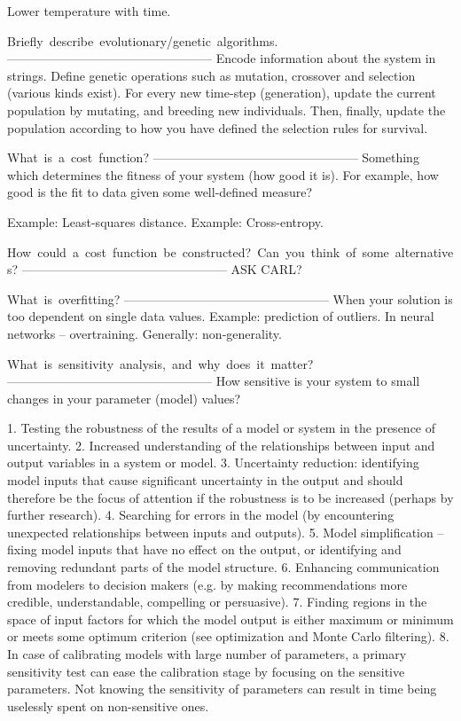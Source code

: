Lower temperature with time. 

Briefly describe evolutionary/genetic algorithms.
--------------------------------------------------
Encode information about the system in strings. Define genetic operations such
as mutation, crossover and selection (various kinds exist). For every new
time-step (generation), update the current population by mutating, and breeding
new individuals. Then, finally, update the population according to how you have
defined the selection rules for survival. 

What is a cost function?
--------------------------------------------------
Something which determines the fitness of your system (how good it is). For
example, how good is the fit to data given some well-defined measure?  

Example: Least-squares distance.
Example: Cross-entropy.

How could a cost function be constructed? Can you think of some alternatives?
--------------------------------------------------
ASK CARL?

What is overfitting?
--------------------------------------------------
When your solution is too dependent on single data values. Example: prediction
of outliers. In neural networks -- overtraining. Generally: non-generality. 
   
What is sensitivity analysis, and why does it matter?
--------------------------------------------------
How sensitive is your system to small changes in your parameter (model) values?  

1. Testing the robustness of the results of a model or system in the presence of uncertainty.
2. Increased understanding of the relationships between input and output variables 
   in a system or model.
3. Uncertainty reduction: identifying model inputs that cause significant uncertainty 
   in the output and should therefore be the focus of attention if the robustness is to be 
   increased (perhaps by further research).
4. Searching for errors in the model (by encountering unexpected relationships between inputs 
   and outputs).
5. Model simplification – fixing model inputs that have no effect on the output, or identifying 
   and removing redundant parts of the model structure.
6. Enhancing communication from modelers to decision makers (e.g. by making recommendations 
   more credible, understandable, compelling or persuasive).
7. Finding regions in the space of input factors for which the model output is either maximum 
   or minimum or meets some optimum criterion (see optimization and Monte Carlo filtering).
8. In case of calibrating models with large number of parameters, a primary sensitivity test 
   can ease the calibration stage by focusing on the sensitive parameters. Not knowing the 
   sensitivity of parameters can result in time being uselessly spent on non-sensitive ones.

